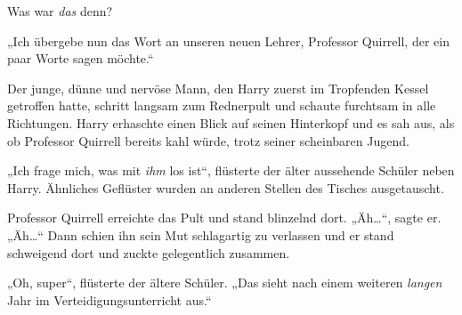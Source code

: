 Was war \emph{das} denn?

„Ich übergebe nun das Wort an unseren neuen Lehrer, Professor Quirrell, der ein paar Worte sagen möchte.“

Der junge, dünne und nervöse Mann, den Harry zuerst im Tropfenden Kessel getroffen hatte, schritt langsam zum Rednerpult und schaute furchtsam in alle Richtungen. Harry erhaschte einen Blick auf seinen Hinterkopf und es sah aus, als ob Professor Quirrell bereits kahl würde, trotz seiner scheinbaren Jugend.

„Ich frage mich, was mit \emph{ihm} los ist“, flüsterte der älter aussehende Schüler neben Harry. Ähnliches Geflüster wurden an anderen Stellen des Tisches ausgetauscht.

Professor Quirrell erreichte das Pult und stand blinzelnd dort. „Äh…“, sagte er. „Äh…“ Dann schien ihn sein Mut schlagartig zu verlassen und er stand schweigend dort und zuckte gelegentlich zusammen.

„Oh, super“, flüsterte der ältere Schüler. „Das sieht nach einem weiteren \emph{langen} Jahr im Verteidigungsunterricht aus.“


